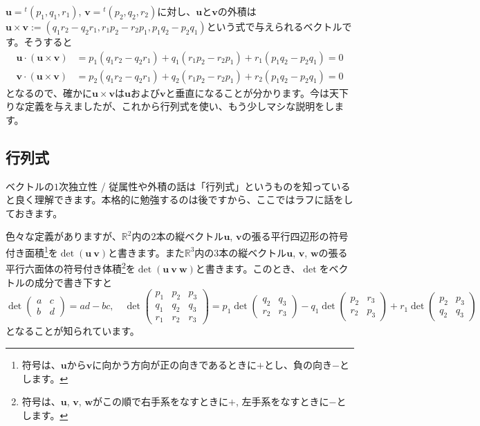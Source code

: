 $\bm{u} = {}^t(p_1, q_1, r_1)$, $\bm{v} = {}^t(p_2, q_2, r_2)$に対し、$\bm{u}$と$\bm{v}$の外積は$\bm{u}\times\bm{v} := (q_1 r_2-q_2 r_1, r_1 p_2-r_2 p_1, p_1 q_2-p_2 q_1)$という式で与えられるベクトルです。そうすると
\begin{align*}
\bm{u}\cdot(\bm{u}\times\bm{v})
&= p_1(q_1 r_2-q_2 r_1) +  q_1(r_1 p_2-r_2 p_1) + r_1(p_1 q_2-p_2 q_1) = 0\\
\bm{v}\cdot(\bm{u}\times\bm{v})
&= p_2(q_1 r_2-q_2 r_1) + q_2(r_1 p_2-r_2 p_1) + r_2(p_1 q_2-p_2 q_1) = 0
\end{align*}
となるので、確かに$\bm{u}\times\bm{v}$は$\bm{u}$および$\bm{v}$と垂直になることが分かります。今は天下りな定義を与えましたが、これから行列式を使い、もう少しマシな説明をします。

\subsection{行列式}

ベクトルの$1$次独立性 / 従属性や外積の話は「行列式」というものを知っていると良く理解できます。本格的に勉強するのは後ですから、ここではラフに話をしておきます。

色々な定義がありますが、$\mathbb{R}^2$内の$2$本の縦ベクトル$\bm{u}$, $\bm{v}$の張る平行四辺形の符号付き面積\footnote{符号は、$\bm{u}$から$\bm{v}$に向かう方向が正の向きであるときに$+$とし、負の向き$-$とします。}を$\det( \bm{u} \  \bm{v} )$と書きます。また$\mathbb{R}^3$内の$3$本の縦ベクトル$\bm{u}$, $\bm{v}$, $\bm{w}$の張る平行六面体の符号付き体積\footnote{符号は、$\bm{u}$, $\bm{v}$, $\bm{w}$がこの順で右手系をなすときに$+$, 左手系をなすときに$-$とします。}を$\det( \bm{u} \ \bm{v} \ \bm{w})$と書きます。このとき、$\det$をベクトルの成分で書き下すと
\[
\det
\begin{pmatrix}
a & c \\
b & d 
\end{pmatrix}
= ad-bc, \quad
\det
\begin{pmatrix}
p_1 & p_2 & p_3 \\
q_1 & q_2 & q_3 \\
r_1 & r_2 & r_3
\end{pmatrix}
=
p_1 \det
\begin{pmatrix}
q_2 & q_3 \\
r_2 & r_3
\end{pmatrix}
-
q_1 \det
\begin{pmatrix}
p_2 & r_3 \\
r_2 & p_3
\end{pmatrix}
+
r_1 \det
\begin{pmatrix}
p_2 & p_3 \\
q_2 & q_3
\end{pmatrix}
\]
となることが知られています。

